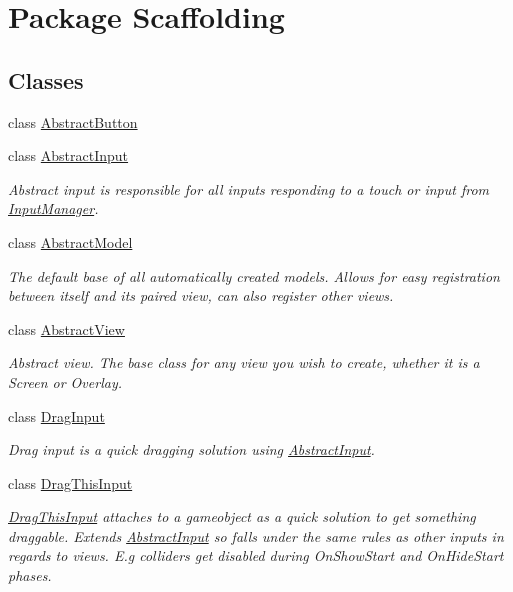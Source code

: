 \hypertarget{namespace_scaffolding}{\section{Package Scaffolding}
\label{namespace_scaffolding}
}
\subsection*{Classes}
\begin{DoxyCompactItemize}
\item 
class \hyperlink{class_scaffolding_1_1_abstract_button}{Abstract\+Button}
\item 
class \hyperlink{class_scaffolding_1_1_abstract_input}{Abstract\+Input}
\begin{DoxyCompactList}\small\item\em Abstract input is responsible for all inputs responding to a touch or input from \hyperlink{class_scaffolding_1_1_input_manager}{Input\+Manager}. \end{DoxyCompactList}\item 
class \hyperlink{class_scaffolding_1_1_abstract_model}{Abstract\+Model}
\begin{DoxyCompactList}\small\item\em The default base of all automatically created models. Allows for easy registration between itself and its paired view, can also register other views. \end{DoxyCompactList}\item 
class \hyperlink{class_scaffolding_1_1_abstract_view}{Abstract\+View}
\begin{DoxyCompactList}\small\item\em Abstract view. The base class for any view you wish to create, whether it is a Screen or Overlay. \end{DoxyCompactList}\item 
class \hyperlink{class_scaffolding_1_1_drag_input}{Drag\+Input}
\begin{DoxyCompactList}\small\item\em Drag input is a quick dragging solution using \hyperlink{class_scaffolding_1_1_abstract_input}{Abstract\+Input}. \end{DoxyCompactList}\item 
class \hyperlink{class_scaffolding_1_1_drag_this_input}{Drag\+This\+Input}
\begin{DoxyCompactList}\small\item\em \hyperlink{class_scaffolding_1_1_drag_this_input}{Drag\+This\+Input} attaches to a gameobject as a quick solution to get something draggable. Extends \hyperlink{class_scaffolding_1_1_abstract_input}{Abstract\+Input} so falls under the same rules as other inputs in regards to views. E.\+g colliders get disabled during On\+Show\+Start and On\+Hide\+Start phases. \end{DoxyCompactList}\item 

\end{DoxyCompactItemize}
